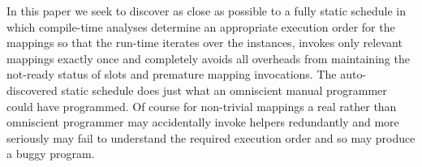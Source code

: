 \documentclass{jot}
\begin{document}
In this paper we seek to discover as close as possible to a fully static schedule in which compile-time analyses determine an appropriate execution order for the mappings so that the run-time iterates over the instances, invokes only relevant mappings exactly once and completely avoids all overheads from maintaining the not-ready status of slots and premature mapping invocations. The auto-discovered static schedule does just what an omniscient manual programmer could have programmed. Of course for non-trivial mappings a real rather than omniscient programmer may accidentally invoke helpers redundantly and more seriously may fail to understand the required execution order and so may produce a buggy program.





\end{document}
